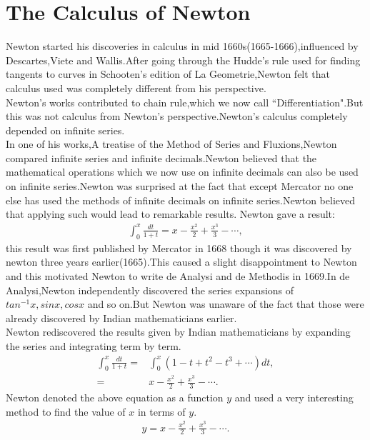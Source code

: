 \documentclass[a4paper,reqno,11pt]{book}
\theoremstyle{plain}%
\theoremstyle{definition}
\begin{document}
\section{The Calculus of Newton}
\noindent Newton started his discoveries in calculus in mid 1660s(1665-1666),influenced by Descartes,Viete and Wallis.After going through the Hudde's rule used for finding tangents to curves in Schooten's edition of La Geometrie,Newton felt that calculus used was completely different from his perspective.\\
\indent Newton's works contributed to chain rule,which we now call ``Differentiation".But this was not calculus from Newton's perspective.Newton's calculus completely depended on infinite series.\\
\indent In one of his works,A treatise of the Method of Series and Fluxions,Newton compared infinite series and infinite decimals.Newton believed that the mathematical operations which we now use on infinite decimals can also be used on infinite series.Newton was surprised at the fact that except Mercator no one else has used the methods of infinite decimals on infinite series.Newton believed that applying such would lead to remarkable results.\cite{ref15} Newton gave a result:
\begin{eqnarray*}
    \int_{0}^{x}\frac{dt}{1+t}=x-\frac{x^2}{2}+\frac{x^3}{3}-\cdots,
\end{eqnarray*}
this result was first published by Mercator in 1668 though it was discovered by newton three years earlier(1665).This caused a slight disappointment to Newton and this motivated Newton to write de Analysi and de Methodis in 1669.In de Analysi,Newton independently discovered the series expansions of $tan^{-1}x,sinx,cosx$ and so on.But Newton was unaware of the fact that those were already discovered by Indian mathematicians earlier.\\
Newton rediscovered the results given by Indian mathematicians by expanding the series and integrating term by term.
\begin{align*}
    \int_{0}^{x}\frac{dt}{1+t}=&\int_{0}^{x}(1-t+t^2-t^3+\cdots)dt,\\
                              =&x-\frac{x^2}{2}+\frac{x^3}{3}-\cdots.
\end{align*}
Newton denoted the above equation as a function $y$ and used a very interesting method to find the value of $x$ in terms of $y$.
\begin{align}
    y=x-\frac{x^2}{2}+\frac{x^3}{3}-\cdots.
\end{align}
\end{document}
